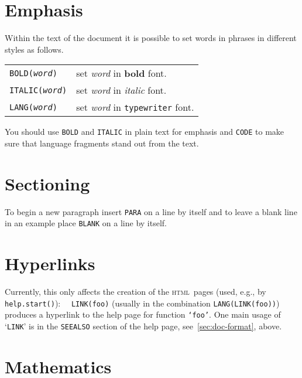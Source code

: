 \documentclass[a4paper]{article}
\newcommand{\HTML}{\textsc{html}}
\begin{document}
\section{Emphasis}
Within the text of the document it is possible to set
words in phrases in different styles as follows.
\begin{center}
\begin{tabular}{ll}
{\tt BOLD(\textit{word})}   & set \emph{word} in \textbf{bold} font. \\
{\tt ITALIC(\textit{word})} & set \emph{word} in \textit{italic} font. \\
{\tt LANG(\textit{word})}   & set \emph{word} in \texttt{typewriter} font. \\
\end{tabular}
\end{center}
You should use \texttt{BOLD} and \texttt{ITALIC} in plain text for emphasis
and \texttt{CODE} to make sure that language fragments stand out from the
text.

\section{Sectioning}
To begin a new paragraph insert \texttt{PARA} on a line by itself
and to leave a blank line in an example place \texttt{BLANK}
on a line by itself.

\section{Hyperlinks}
Currently, this only affects the creation of the \HTML\ pages (used, e.g.,
by \texttt{help.start()}): \ \
\texttt{LINK(foo)} (usually in the combination \texttt{LANG(LINK(foo))})
produces a hyperlink to the help page for function
\texttt{`foo'}.
One main usage of  `\texttt{LINK}' is in the \texttt{SEEALSO} section of
the help page, see~\ref{sec:doc-format}, above.


\pagebreak[3]

\section{Mathematics}
\end{document}
